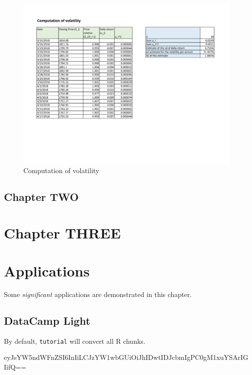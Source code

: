 \documentclass[landscape, 20pt]{extreport}
\theoremstyle{definition}
\theoremstyle{definition}
\theoremstyle{definition}
\theoremstyle{definition}
\theoremstyle{remark}
\begin{document}
\begin{figure}
\hypertarget{fig:volatility}{%
\centering
\includegraphics[width=7in,height=\textheight]{VolatilityEstimation2.pdf}
\caption{Computation of volatility}\label{fig:volatility}
}
\end{figure}

\hypertarget{chapter-two}{%
\section{Chapter TWO}\label{chapter-two}}

\hypertarget{chapter-three}{%
\chapter{Chapter THREE}\label{chapter-three}}

\hypertarget{applications}{%
\chapter{Applications}\label{applications}}

Some \emph{significant} applications are demonstrated in this chapter.

\hypertarget{datacamp-light}{%
\section{DataCamp Light}\label{datacamp-light}}

By default, \texttt{tutorial} will convert all R chunks.

eyJsYW5ndWFnZSI6InIiLCJzYW1wbGUiOiJhIDwtIDJcbmIgPC0gM1xuYSArIGIifQ==

  
\end{document}
